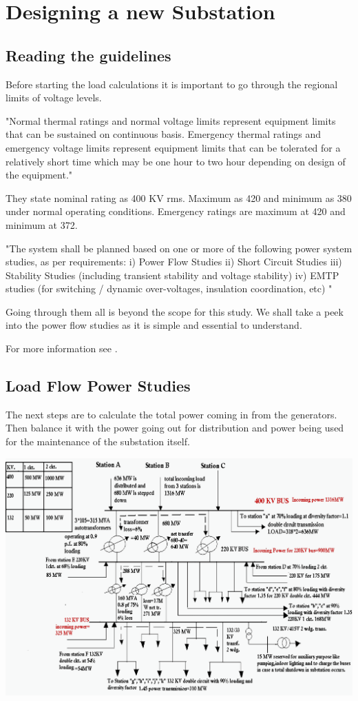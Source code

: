 \documentclass[11pt, a4paper]{article} %
\begin{document}
\section{Designing a new Substation}

\subsection{Reading the guidelines}

Before starting the load calculations it is important to go through the regional limits of voltage levels.  

"Normal thermal ratings and normal voltage limits represent equipment limits
that can be sustained on continuous basis. Emergency thermal ratings and emergency voltage limits represent equipment limits that can be tolerated for a relatively short time which may be one hour to two hour depending on design of the equipment." 

They state nominal rating as 400 KV rms. Maximum as 420 and minimum as 380 under normal operating conditions. Emergency ratings are maximum at 420 and minimum at 372. 

"The system shall be planned based on one or more of the following power
system studies, as per requirements:
i) Power Flow Studies
ii) Short Circuit Studies
iii) Stability Studies (including transient stability and voltage stability)
iv) EMTP studies (for switching / dynamic over-voltages, insulation
coordination, etc) "

Going through them  all is beyond the scope for this study. We shall take a peek into the power flow studies as it is simple and essential to understand.

For more information see \citet{manualontransmission}.
 
\subsection{Load Flow Power Studies}

The next steps are to calculate the total power coming in from the generators. Then balance it with the power going out for distribution and power being used for the maintenance of the substation itself.

\includegraphics[scale=0.3]{substation-load-distribution-diagram}
\end{document}

